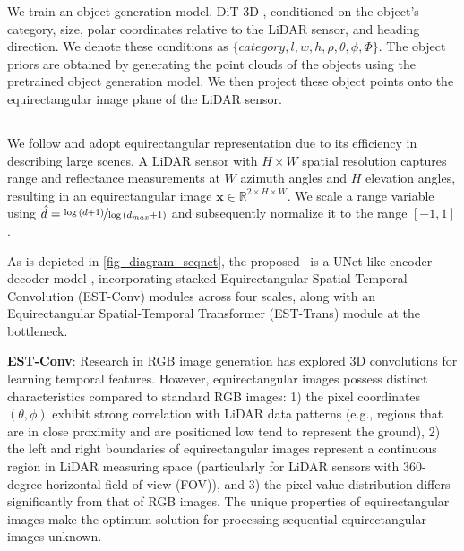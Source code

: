 We train an object generation model, DiT-3D \cite{mo2023ditd}, conditioned on the object's category, size, polar coordinates relative to the LiDAR sensor, and heading direction. We denote these conditions as \(\{category, l, w, h, \rho, \theta, \phi, \Phi\}\). The object priors are obtained by generating the point clouds of the objects using the pretrained object generation model. We then project these object points onto the equirectangular image plane of the LiDAR sensor. 


\subsection{\modelname}

\label{sec_seqnet}


We follow \cite{nakashima2024lidar, wu2024text2lidar} and adopt equirectangular representation due to its efficiency in describing large scenes.  A LiDAR sensor with $H \times W$ spatial resolution captures range and reflectance measurements at $W$ azimuth angles and $H$ elevation angles, resulting in an equirectangular image $\boldsymbol{x} \in \mathbb{R}^{2\times H \times W}$. 
We scale a range variable using ${\hat{d}}= \nicefrac{\log{(d+1)}}{\log{(d_{max}+1)}}$ and subsequently normalize it to the range $[-1, 1]$.


As is depicted in \cref{fig_diagram_seqnet}, the proposed \modelname\ is a UNet-like encoder-decoder model \cite{saharia2022photorealistic}, incorporating stacked Equirectangular Spatial-Temporal Convolution (EST-Conv) modules across four scales, along with an Equirectangular Spatial-Temporal Transformer (EST-Trans) module at the bottleneck. 




\noindent \textbf{EST-Conv}:
Research in RGB image generation has explored 3D convolutions for learning temporal features. However, equirectangular images possess distinct characteristics compared to standard RGB images:  1) the pixel coordinates $(\theta, \phi)$ exhibit strong correlation with LiDAR data patterns (e.g., regions that are in close proximity and are positioned low tend to represent the ground), 2) the left and right boundaries of equirectangular images represent a continuous region in LiDAR measuring space (particularly for LiDAR sensors with 360-degree horizontal field-of-view (FOV)), and 3) the pixel value distribution differs significantly from that of RGB images. The unique properties of equirectangular images make the optimum solution for processing sequential equirectangular images unknown.

